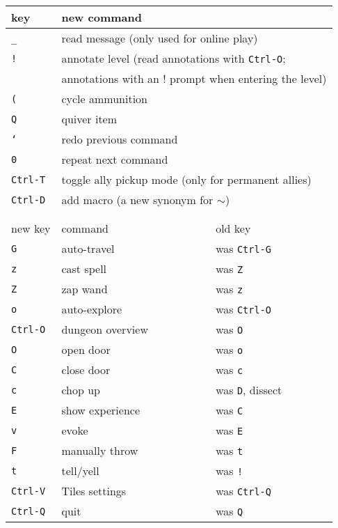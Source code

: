 \documentclass[a4paper,10pt]{article}
\newcommand{\key}[1]{{\texttt{#1}}} %
\newcommand{\mc}[1]{\multicolumn{2}{l}{#1}}
\begin{document}
\begin{center}
\begin{tabular}{lll}
key          & new command \\ \hline
\key{\_}     & \mc{read message (only used for online play)} \\
\key{!}      & \mc{annotate level (read annotations with \key{Ctrl-O};} \\
             & \mc{annotations with an ! prompt when entering the level)} \\
\key{(}      & \mc{cycle ammunition} \\
\key{Q}      & \mc{quiver item}      \\
\key{`}      & \mc{redo previous command} \\
\key{0}      & \mc{repeat next command} \\
\key{Ctrl-T} & \mc{toggle ally pickup mode (only for permanent allies)} \\
\key{Ctrl-D} & \mc{add macro (a new synonym for \key{$\sim$})} \\
\\
\\
new key      & command          & old key \\ \hline
\key{G}      & auto-travel      & was \key{Ctrl-G} \\
\key{z}      & cast spell       & was \key{Z}      \\
\key{Z}      & zap wand         & was \key{z}      \\
\key{o}      & auto-explore     & was \key{Ctrl-O} \\
\key{Ctrl-O} & dungeon overview\phantom{xxx} & was \key{O}      \\
\key{O}      & open door        & was \key{o}      \\
\key{C}      & close door       & was \key{c}      \\
\key{c}      & chop up          & was \key{D}, dissect \\
\key{E}      & show experience  & was \key{C}      \\
\key{v}      & evoke            & was \key{E}      \\
\key{F}      &  manually throw  & was \key{t}      \\
\key{t}      & tell/yell        & was \key{!}      \\
\key{Ctrl-V} & Tiles settings   & was \key{Ctrl-Q} \\
\key{Ctrl-Q} & quit             & was \key{Q}
\end{tabular}
\end{center}
\end{document}
